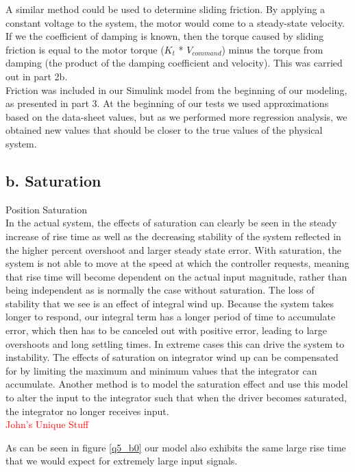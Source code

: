 \documentclass{article}
\newcommand{\xxx}[1]{\textcolor{red}{#1}}
\theoremstyle{plain}
\theoremstyle{definition}
\theoremstyle{remark}
\begin{document}
A similar method could be used to determine sliding friction. By applying a constant voltage to the system, the motor would come to a steady-state velocity. If we the coefficient of damping is known, then the torque caused by sliding friction is equal to the motor torque ($K_{t}$ * $V_{command}$) minus the torque from damping (the product of the damping coefficient and velocity). This was carried out in part 2b.\\

Friction was included in our Simulink model from the beginning of our modeling, as presented in part 3. At the beginning of our tests we used approximations based on the data-sheet values, but as we performed more regression analysis, we obtained new values that should be closer to the true values of the physical system. \\

\subsection*{b. Saturation}

Position Saturation\\

In the actual system, the effects of saturation can clearly be seen in the steady increase of rise time as well as the decreasing stability of the system reflected in the higher percent overshoot and larger steady state error.  With saturation, the system is not able to move at the speed at which the controller requests, meaning that rise time will become dependent on the actual input magnitude, rather than being independent as is normally the case without saturation.  The loss of stability that we see is an effect of integral wind up.  Because the system takes longer to respond, our integral term has a longer period of time to accumulate error, which then has to be canceled out with positive error, leading to large overshoots and long settling times.  In extreme cases this can drive the system to instability.  The effects of saturation on integrator wind up can be compensated for by limiting the maximum and minimum values that the integrator can accumulate.  Another method is to model the saturation effect and use this model to alter the input to the integrator such that when the driver becomes saturated, the integrator no longer receives input. \\

\xxx{John's Unique Stuff}

As can be seen in figure \ref{q5_b0} our model also exhibits the same large rise time that we would expect for extremely large input signals.  
\end{document}
